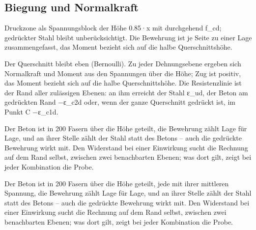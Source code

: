 \documentclass[11pt,a4paper]{article}
\begin{document}
\subsection{Biegung und Normalkraft}
Druckzone als Spannungsblock der Höhe 0.85·x mit durchgehend f\_cd; gedrückter Stahl bleibt unberücksichtigt. Die Bewehrung ist je Seite zu einer Lage zusammengefasst, das Moment bezieht sich auf die halbe Querschnittshöhe.

Der Querschnitt bleibt eben (Bernoulli). Zu jeder Dehnungsebene ergeben sich Normalkraft und Moment aus den Spannungen über die Höhe; Zug ist positiv, das Moment bezieht sich auf die halbe Querschnittshöhe. Die Resistenzlinie ist der Rand aller zulässigen Ebenen: an ihm erreicht der Stahl ε\_ud, der Beton am gedrückten Rand −ε\_c2d oder, wenn der ganze Querschnitt gedrückt ist, im Punkt C −ε\_c1d.

Der Beton ist in 200 Fasern über die Höhe geteilt, die Bewehrung zählt Lage für Lage, und an ihrer Stelle zählt der Stahl statt des Betons – auch die gedrückte Bewehrung wirkt mit. Den Widerstand bei einer Einwirkung sucht die Rechnung auf dem Rand selbst, zwischen zwei benachbarten Ebenen; was dort gilt, zeigt bei jeder Kombination die Probe.

Der Beton ist in 200 Fasern über die Höhe geteilt, jede mit ihrer mittleren Spannung, die Bewehrung zählt Lage für Lage, und an ihrer Stelle zählt der Stahl statt des Betons – auch die gedrückte Bewehrung wirkt mit. Den Widerstand bei einer Einwirkung sucht die Rechnung auf dem Rand selbst, zwischen zwei benachbarten Ebenen; was dort gilt, zeigt bei jeder Kombination die Probe.
\end{document}
